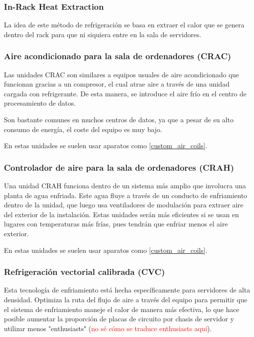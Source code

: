 \subsubsection{In-Rack Heat Extraction}

La idea de este método de refrigeración se basa en extraer el calor que se genera dentro del rack para que ni siquiera entre en la sala de servidores.

\subsubsection{Aire acondicionado para la sala de ordenadores (CRAC)}

Las unidades CRAC son similares a equipos usuales de aire acondicionado que funcionan gracias a un compresor, el cual atrae aire a través de una unidad cargada con refrigerante. De esta manera, se introduce el aire frío en el centro de procesamiento de datos.

Son bastante comunes en muchos centros de datos, ya que a pesar de su alto consumo de energía, el coste del equipo es muy bajo.

En estas unidades se suelen usar aparatos como \ref{custom_air_coils}.

\subsubsection{Controlador de aire para la sala de ordenadores (CRAH)}

Una unidad CRAH funciona dentro de un sistema más amplio que involucra una planta de agua enfriada. Este agua fluye a través de un conducto de enfriamiento dentro de la unidad, que luego usa ventiladores de modulación para extraer aire del exterior de la instalación. Estas unidades serán más eficientes si se usan en lugares con temperaturas más frías, pues tendrán que enfriar menos el aire exterior.

En estas unidades se suelen usar aparatos como \ref{custom_air_coils}.

\subsubsection{Refrigeración vectorial calibrada (CVC)}

Esta tecnología de enfriamiento está hecha específicamente para servidores de alta densidad. Optimiza la ruta del flujo de aire a través del equipo para permitir que el sistema de enfriamiento maneje el calor de manera más efectiva, lo que hace posible aumentar la proporción de placas de circuito por chasis de servidor y utilizar menos "enthusiasts" (\textcolor{red}{no sé cómo se traduce enthusiasts aquí}).

